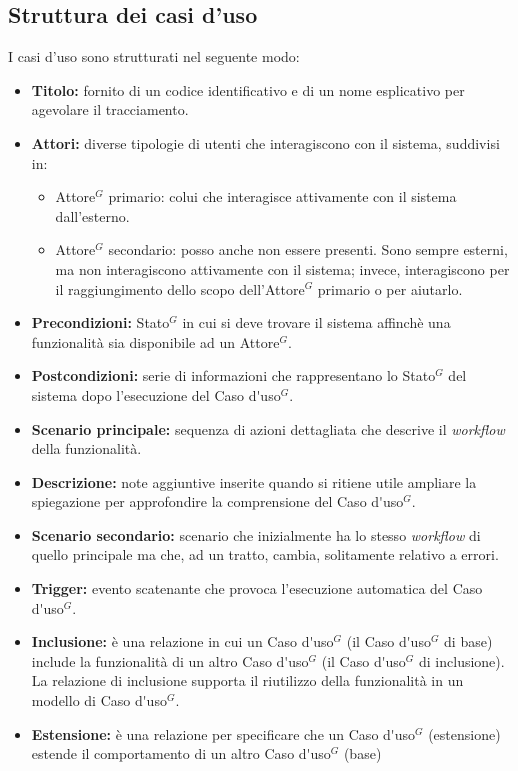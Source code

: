 \subsection{Struttura dei casi d'uso}
I casi d'uso sono strutturati nel seguente modo:
\begin{itemize}
	\item \textbf{Titolo:} fornito di un codice identificativo e di un nome esplicativo per agevolare il tracciamento.
	\item \textbf{Attori:} diverse tipologie di utenti che interagiscono con il sistema, suddivisi in:
	\begin{itemize}
		\item \gls{Attore}$^G$ primario: colui che interagisce attivamente con il sistema dall'esterno.
		\item \gls{Attore}$^G$ secondario: posso anche non essere presenti. 
		Sono sempre esterni, ma non interagiscono attivamente con il sistema; invece, interagiscono per il raggiungimento dello scopo dell'\gls{Attore}$^G$ primario o per aiutarlo.
	\end{itemize}
	\item \textbf{Precondizioni:} \gls{Stato}$^G$ in cui si deve trovare il sistema affinchè una funzionalità sia disponibile ad un \gls{Attore}$^G$.
	\item \textbf{Postcondizioni:} serie di informazioni che rappresentano lo \gls{Stato}$^G$ del sistema dopo l'esecuzione del \gls{Caso d'uso}$^G$.
	\item \textbf{Scenario principale:} sequenza di azioni dettagliata che descrive il \textit{workflow} della funzionalità.
	\item \textbf{Descrizione:} note aggiuntive inserite quando si ritiene utile ampliare la spiegazione per approfondire la comprensione del \gls{Caso d'uso}$^G$.
	\item \textbf{Scenario secondario:} scenario che inizialmente ha lo stesso \textit{workflow} di quello principale ma che, ad un tratto, cambia, solitamente relativo a errori.
	\item \textbf{Trigger:} evento scatenante che provoca l'esecuzione automatica del \gls{Caso d'uso}$^G$.
	\item \textbf{Inclusione:} è una relazione in cui un \gls{Caso d'uso}$^G$ (il \gls{Caso d'uso}$^G$ di base) include la funzionalità di un altro \gls{Caso d'uso}$^G$ (il \gls{Caso d'uso}$^G$ di inclusione). 
		La relazione di inclusione supporta il riutilizzo della funzionalità in un modello di \gls{Caso d'uso}$^G$.
	\item \textbf{Estensione:} è una relazione per specificare che un \gls{Caso d'uso}$^G$ (estensione) estende il comportamento di un altro \gls{Caso d'uso}$^G$ (base)

\end{itemize}
